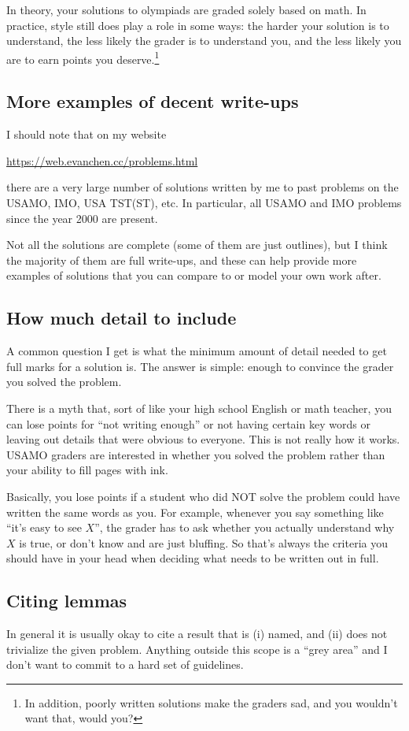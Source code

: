 \documentclass[11pt]{scrartcl}
\begin{document}
In theory, your solutions to olympiads are graded solely based on math.
In practice, style still does play a role in some ways:
the harder your solution is to understand,
the less likely the grader is to understand you,
and the less likely you are to earn points you deserve.\footnote{In addition,
  poorly written solutions make the graders sad, and you wouldn't want that, would you?}

\subsection{More examples of decent write-ups}
I should note that on my website
\begin{center}
  \url{https://web.evanchen.cc/problems.html}
\end{center}
there are a very large number of solutions written by me
to past problems on the USAMO, IMO, USA TST(ST), etc.
In particular, all USAMO and IMO problems since the year 2000
are present.

Not all the solutions are complete
(some of them are just outlines),
but I think the majority of them are full write-ups,
and these can help provide more examples of solutions
that you can compare to or model your own work after.

\subsection{How much detail to include}
A common question I get is what the minimum amount of detail needed
to get full marks for a solution is.
The answer is simple: enough to convince the grader you solved the problem.

There is a myth that, sort of like your high school English or math teacher,
you can lose points for ``not writing enough'' or not having certain key words
or leaving out details that were obvious to everyone.
This is not really how it works.
USAMO graders are interested in whether you solved the problem
rather than your ability to fill pages with ink.

Basically, \alert{you lose points if a student who did NOT solve the problem
could have written the same words as you}.
For example, whenever you say something like ``it's easy to see $X$'',
the grader has to ask whether you actually understand why $X$ is true,
or don't know and are just bluffing.
So that's always the criteria you should have in your head
when deciding what needs to be written out in full.

\subsection{Citing lemmas}
In general it is usually okay to cite a result that is
(i) named, and (ii) does not trivialize the given problem.
Anything outside this scope is a ``grey area''
and I don't want to commit to a hard set of guidelines.
\end{document}

